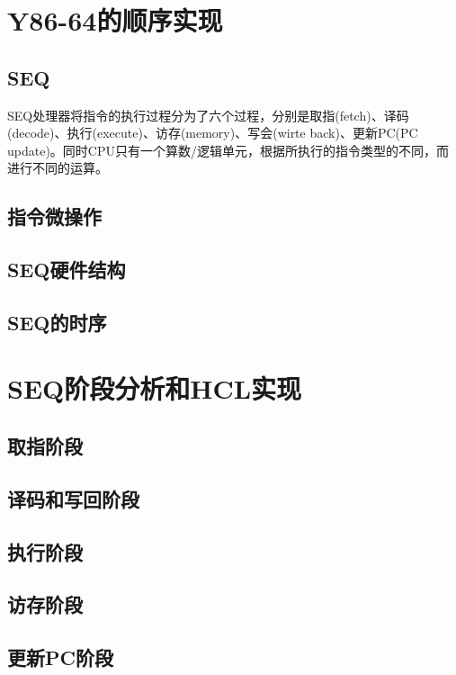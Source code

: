 \documentclass[a4paper,12pt]{report}
\begin{document}
\chapter{Y86-64的顺序实现}
\begin{spacing}{1.5}
\section{SEQ}
	SEQ处理器将指令的执行过程分为了六个过程，分别是取指(fetch)、译码(decode)、执行(execute)、访存(memory)、写会(wirte back)、更新PC(PC update)。同时CPU只有一个算数/逻辑单元，根据所执行的指令类型的不同，而进行不同的运算。
	
\section{指令微操作}
	
\section{SEQ硬件结构}

\section{SEQ的时序}

\end{spacing}


\chapter{SEQ阶段分析和HCL实现}
\begin{spacing}{1.5}
	
\section{取指阶段}	

\section{译码和写回阶段}
	
\section{执行阶段}
	

\section{访存阶段}
	
\section{更新PC阶段}
	
\end{spacing}
\end{document}
